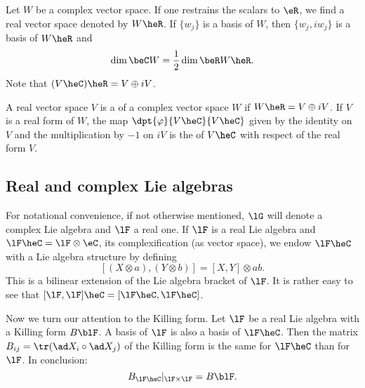 Let $W$ be a complex vector space. If one restrains the scalars to $\eR$, we find a real vector space denoted by $W\heR$. If $\{w_j\}$ is a basis of $W$, then $\{w_j,iw_j\}$ is a basis of $W\heR$ and
\[
  \dim\beC W=\frac{1}{2}\dim\beR W\heR.
\]
Note that $(V\heC)\heR=V\oplus iV$.

A real vector space $V$ is a  of a complex vector space $W$ if $W\heR=V\oplus iV$. If $V$ is a real form of $W$, the map $\dpt{\varphi}{V\heC}{V\heC}$ given by the identity on $V$ and the multiplication by $-1$ on $iV$ is the  of $V\heC$ with respect of the real form $V$.

\subsection{Real and complex Lie algebras}

For notational convenience, if not otherwise mentioned, $\lG$ will denote a complex Lie algebra and $\lF$ a real one. If $\lF$ is a real Lie algebra and $\lF\heC=\lF\otimes\eC$, its complexification (as vector space), we endow $\lF\heC$ with a Lie algebra structure by defining
\[
  [ (X\otimes a),(Y\otimes b)  ]=[X,Y]\otimes ab.
\]
This is a bilinear extension of the Lie algebra bracket of $\lF$. It is rather easy to see that $[\lF,\lF]\heC=[\lF\heC,\lF\heC]$.

Now we turn our attention to the Killing form. Let $\lF$ be a real Lie algebra with a Killing form $B\blF$. A basis of $\lF$ is also a basis of $\lF\heC$. Then the matrix $B_{ij}=\tr( \ad X_i\circ\ad X_j )$ of the Killing form is the same for $\lF\heC$ than for $\lF$. In conclusion:
\[
   B_{\lF\heC}|_{\lF\times\lF}=B\blF.
\]


